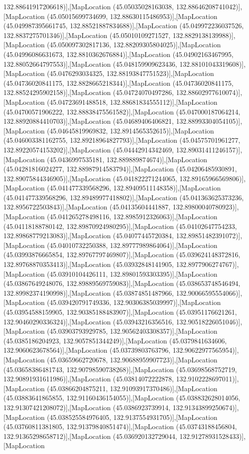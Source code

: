 132.88641917206618)],[MapLocation (45.05035028163038, 132.88646208741042)],[MapLocation (45.05015699734699, 132.88630115486953)],[MapLocation (45.049987395661745, 132.88521887834688)],[MapLocation (45.049972236037526, 132.8837275701346)],[MapLocation (45.05010109271527, 132.8829138139988)],[MapLocation (45.050097302817136, 132.88209305804025)],[MapLocation (45.04996086631673, 132.8810362676884)],[MapLocation (45.04902163467995, 132.88052664797553)],[MapLocation (45.048159909623436, 132.88101043319608)],[MapLocation (45.0476293034325, 132.88193847751523)],[MapLocation (45.04736020841175, 132.8828665218344)],[MapLocation (45.04736020841175, 132.88524295902158)],[MapLocation (45.04724070497286, 132.88602977610074)],[MapLocation (45.04723691488518, 132.88681834555112)],[MapLocation (45.04700571906222, 132.88838475561582)],[MapLocation (45.047000187064214, 132.88920884410703)],[MapLocation (45.04689406406821, 132.88993304054105)],[MapLocation (45.04645819969832, 132.8914565352615)],[MapLocation (45.046003381162755, 132.89218964827793)],[MapLocation (45.04575701961277, 132.89220574153202)],[MapLocation (45.04442914342469, 132.89031411246157)],[MapLocation (45.0436997535181, 132.889889874674)],[MapLocation (45.04281816024277, 132.88987914583794)],[MapLocation (45.04206485930891, 132.89075844346905)],[MapLocation (45.041822271244065, 132.89165966569806)],[MapLocation (45.041477339568296, 132.89409511148358)],[MapLocation (45.041477339568296, 132.89489977418802)],[MapLocation (45.041363625373236, 132.8956722503843)],[MapLocation (45.04135604441887, 132.89800040780923)],[MapLocation (45.041265278498116, 132.8985912326063)],[MapLocation (45.04118188780142, 132.89870924980295)],[MapLocation (45.04102647754233, 132.89868779213083)],[MapLocation (45.04077445720384, 132.89851482391072)],[MapLocation (45.04010732250388, 132.89777989864064)],[MapLocation (45.03993876665854, 132.89767797469807)],[MapLocation (45.039624148372816, 132.89768870353413)],[MapLocation (45.03932848141905, 132.8977906274767)],[MapLocation (45.03910104426111, 132.89801593303395)],[MapLocation (45.03867649248076, 132.89889569759083)],[MapLocation (45.038653748546494, 132.89982374190998)],[MapLocation (45.03874851487966, 132.90066595554066)],[MapLocation (45.039420791749336, 132.90306385039997)],[MapLocation (45.03954588159905, 132.90385188483907)],[MapLocation (45.03951176621261, 132.90460290336324)],[MapLocation (45.03943216356516, 132.90518226051046)],[MapLocation (45.03903793929785, 132.90562403308357)],[MapLocation (45.0385186204923, 132.9057851344249)],[MapLocation (45.0379841634606, 132.9060623678564)],[MapLocation (45.03739803763796, 132.90622977565954)],[MapLocation (45.03659662720678, 132.90688959907723)],[MapLocation (45.03658386481743, 132.90798590738268)],[MapLocation (45.03698568752719, 132.90891931611986)],[MapLocation (45.03814072222878, 132.9102228697011)],[MapLocation (45.03866204875211, 132.91093917370486)],[MapLocation (45.03883641865855, 132.91160436154055)],[MapLocation (45.038832628014056, 132.91307421208072)],[MapLocation (45.0386923739914, 132.91343899250674)],[MapLocation (45.038525584976405, 132.9137554931705)],[MapLocation (45.03760811381805, 132.91379840851474)],[MapLocation (45.03743188456804, 132.91365298658712)],[MapLocation (45.036920132729044, 132.91278931528433)],[MapLocation 